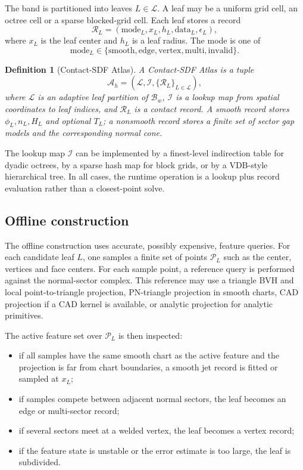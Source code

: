 \documentclass[preprint,12pt,sort&compress]{elsarticle}
\newtheorem{definition}{Definition}
\newcommand{\cA}{\mathcal{A}}
\newcommand{\cL}{\mathcal{L}}
\newcommand{\cR}{\mathcal{R}}
\newcommand{\cP}{\mathcal{P}}
\newcommand{\cB}{\mathcal{B}}
\begin{document}
The band is partitioned into leaves $L\in\cL$. A leaf may be a uniform grid cell, an octree cell or a sparse blocked-grid cell. Each leaf stores a record
\begin{equation}
 \cR_L = (\mathrm{mode}_L, x_L, h_L, \mathrm{data}_L, \epsilon_L),
\end{equation}
where $x_L$ is the leaf center and $h_L$ is a leaf radius. The mode is one of
\begin{equation}
 \mathrm{mode}_L\in\{\mathrm{smooth},\mathrm{edge},\mathrm{vertex},\mathrm{multi},\mathrm{invalid}\}.
\end{equation}

\begin{definition}[Contact-SDF Atlas]
A Contact-SDF Atlas is a tuple
\begin{equation}
 \cA_h = (\cL, \mathcal{I}, \{\cR_L\}_{L\in\cL}),
\end{equation}
where $\cL$ is an adaptive leaf partition of $\cB_w$, $\mathcal{I}$ is a lookup map from spatial coordinates to leaf indices, and $\cR_L$ is a contact record. A smooth record stores $\phi_L,n_L,H_L$ and optional $T_L$; a nonsmooth record stores a finite set of sector gap models and the corresponding normal cone.
\end{definition}

The lookup map $\mathcal I$ can be implemented by a finest-level indirection table for dyadic octrees, by a sparse hash map for block grids, or by a VDB-style hierarchical tree. In all cases, the runtime operation is a lookup plus record evaluation rather than a closest-point solve.

\subsection{Offline construction}

The offline construction uses accurate, possibly expensive, feature queries. For each candidate leaf $L$, one samples a finite set of points $\cP_L$ such as the center, vertices and face centers. For each sample point, a reference query is performed against the normal-sector complex. This reference may use a triangle BVH and local point-to-triangle projection, PN-triangle projection in smooth charts, CAD projection if a CAD kernel is available, or analytic projection for analytic primitives.

The active feature set over $\cP_L$ is then inspected:
\begin{itemize}[leftmargin=1.6em]
\item if all samples have the same smooth chart as the active feature and the projection is far from chart boundaries, a smooth jet record is fitted or sampled at $x_L$;
\item if samples compete between adjacent normal sectors, the leaf becomes an edge or multi-sector record;
\item if several sectors meet at a welded vertex, the leaf becomes a vertex record;
\item if the feature state is unstable or the error estimate is too large, the leaf is subdivided.
\end{itemize}
\end{document}
